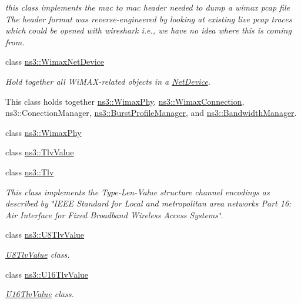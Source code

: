 \begin{DoxyCompactItemize}
\begin{DoxyCompactList}\small\item\em this class implements the mac to mac header needed to dump a wimax pcap file The header format was reverse-\/engineered by looking at existing live pcap traces which could be opened with wireshark i.\+e., we have no idea where this is coming from. \end{DoxyCompactList}\item 
class \hyperlink{classns3_1_1WimaxNetDevice}{ns3\+::\+Wimax\+Net\+Device}
\begin{DoxyCompactList}\small\item\em Hold together all Wi\+M\+A\+X-\/related objects in a \hyperlink{classns3_1_1NetDevice}{Net\+Device}.

This class holds together \hyperlink{classns3_1_1WimaxPhy}{ns3\+::\+Wimax\+Phy}, \hyperlink{classns3_1_1WimaxConnection}{ns3\+::\+Wimax\+Connection}, ns3\+::\+Conection\+Manager, \hyperlink{classns3_1_1BurstProfileManager}{ns3\+::\+Burst\+Profile\+Manager}, and \hyperlink{classns3_1_1BandwidthManager}{ns3\+::\+Bandwidth\+Manager}. \end{DoxyCompactList}\item 
class \hyperlink{classns3_1_1WimaxPhy}{ns3\+::\+Wimax\+Phy}
\item 
class \hyperlink{classns3_1_1TlvValue}{ns3\+::\+Tlv\+Value}
\item 
class \hyperlink{classns3_1_1Tlv}{ns3\+::\+Tlv}
\begin{DoxyCompactList}\small\item\em This class implements the Type-\/\+Len-\/\+Value structure channel encodings as described by \char`\"{}\+I\+E\+E\+E Standard for
\+Local and metropolitan area networks Part 16\+: Air Interface for Fixed Broadband Wireless Access Systems\char`\"{}. \end{DoxyCompactList}\item 
class \hyperlink{classns3_1_1U8TlvValue}{ns3\+::\+U8\+Tlv\+Value}
\begin{DoxyCompactList}\small\item\em \hyperlink{classns3_1_1U8TlvValue}{U8\+Tlv\+Value} class. \end{DoxyCompactList}\item 
class \hyperlink{classns3_1_1U16TlvValue}{ns3\+::\+U16\+Tlv\+Value}
\begin{DoxyCompactList}\small\item\em \hyperlink{classns3_1_1U16TlvValue}{U16\+Tlv\+Value} class. \end{DoxyCompactList}\item 

\end{DoxyCompactItemize}
